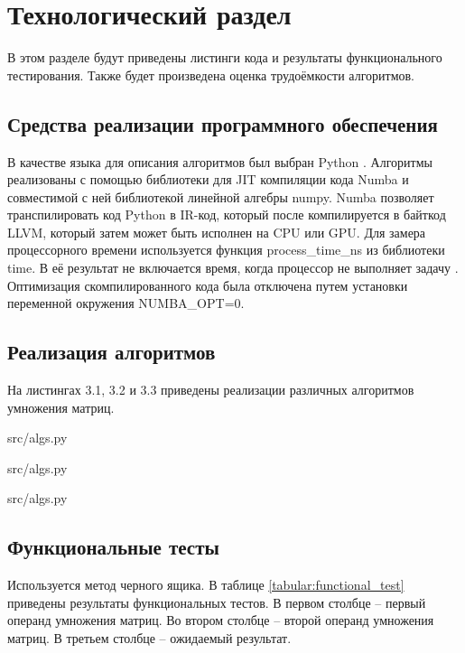 \chapter{Технологический раздел}
В этом разделе будут приведены листинги кода и результаты функционального тестирования.
Также будет произведена оценка трудоёмкости алгоритмов.

\section{Средства реализации программного обеспечения}
В качестве языка для описания алгоритмов был выбран Python \cite{10.5555/1593511}.
Алгоритмы реализованы с помощью библиотеки для JIT компиляции кода Numba \cite{numba} и совместимой с ней библиотекой линейной алгебры numpy.
Numba позволяет транспилировать код Python в IR-код, который после компилируется в байткод LLVM, который затем может быть исполнен на CPU или GPU.
Для замера процессорного времени используется функция process\_time\_ns из библиотеки time. 
В её результат не включается время, когда процессор не выполняет задачу \cite{python}. 
Оптимизация скомпилированного кода была отключена путем установки переменной окружения NUMBA\_OPT=0.

\section{Реализация алгоритмов}
\FloatBarrier
На листингах 3.1, 3.2 и 3.3 приведены реализации различных алгоритмов умножения матриц.
\begin{lstinputlisting}[language=Python, caption=Реализация алгоритма классического умножения матриц, linerange={13-26},
	basicstyle=\small\sffamily, frame=single]{src/algs.py}
\end{lstinputlisting}
\FloatBarrier

\FloatBarrier
\begin{lstinputlisting}[language=Python, caption=Реализация алгоритма Винограда, linerange={28-67},
	basicstyle=\small\sffamily, frame=single]{src/algs.py}
\end{lstinputlisting}
\FloatBarrier

\FloatBarrier
\begin{lstinputlisting}[language=Python, caption=Реализация оптимизированного алгоритма Винограда, linerange={69-105},
	basicstyle=\small\sffamily, frame=single]{src/algs.py}
\end{lstinputlisting}
\FloatBarrier

\section{Функциональные тесты}
Используется метод черного ящика.
В таблице \ref{tabular:functional_test} приведены результаты функциональных тестов. 
В первом столбце -- первый операнд умножения матриц.
Во втором столбце -- второй операнд умножения матриц.
В третьем столбце -- ожидаемый результат.

